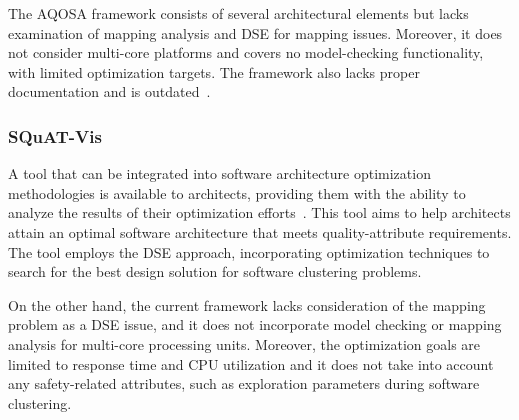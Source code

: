 The AQOSA framework consists of several architectural elements but lacks examination of mapping analysis and DSE for mapping issues. Moreover, it does not consider multi-core platforms and covers no model-checking functionality, with limited optimization targets. The framework also lacks proper documentation and is outdated~\cite{askaripoor2022architecture}.




\subsubsection{SQuAT-Vis}
A tool that can be integrated into software architecture optimization methodologies is available to architects, providing them with the ability to analyze the results of their optimization efforts~\cite{frank2020squat}. This tool aims to help architects attain an optimal software architecture that meets quality-attribute requirements. The tool employs the DSE approach, incorporating optimization techniques to search for the best design solution for software clustering problems.





On the other hand, the current framework lacks consideration of the mapping problem as a DSE issue, and it does not incorporate model checking or mapping analysis for multi-core processing units. Moreover, the optimization goals are limited to response time and CPU utilization and it does not take into account any safety-related attributes, such as exploration parameters during software clustering.






